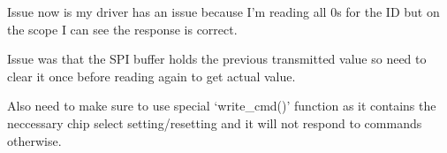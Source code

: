 Issue now is my driver has an issue because I'm reading all 0s for the
ID but on the scope I can see the response is correct.

Issue was that the SPI buffer holds the previous transmitted value so need to clear it once
before reading again to get actual value.

Also need to make sure to use special `write\_cmd()' function as it contains the neccessary
chip select setting/resetting and it will not respond to commands otherwise.
